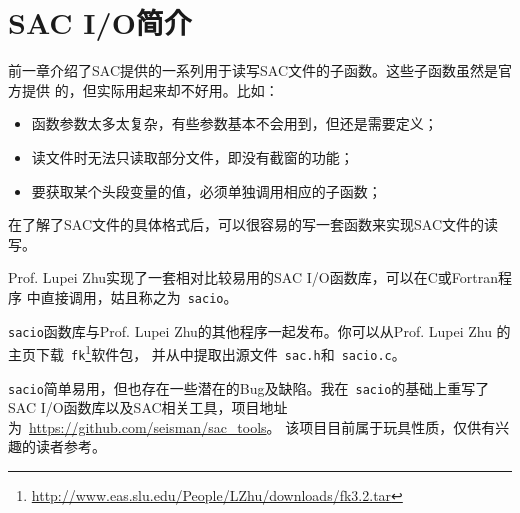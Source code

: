 \section{SAC I/O简介}
前一章介绍了SAC提供的一系列用于读写SAC文件的子函数。这些子函数虽然是官方提供
的，但实际用起来却不好用。比如：
\begin{itemize}
\item 函数参数太多太复杂，有些参数基本不会用到，但还是需要定义；
\item 读文件时无法只读取部分文件，即没有截窗的功能；
\item 要获取某个头段变量的值，必须单独调用相应的子函数；
\end{itemize}

在了解了SAC文件的具体格式后，可以很容易的写一套函数来实现SAC文件的读写。

Prof. Lupei Zhu实现了一套相对比较易用的SAC I/O函数库，可以在C或Fortran程序
中直接调用，姑且称之为~\verb+sacio+。

\verb+sacio+函数库与Prof. Lupei Zhu的其他程序一起发布。你可以从Prof. Lupei Zhu
的主页下载~\verb+fk+\footnote{\url{http://www.eas.slu.edu/People/LZhu/downloads/fk3.2.tar}}软件包，
并从中提取出源文件~\verb+sac.h+和~\verb+sacio.c+。

\verb+sacio+简单易用，但也存在一些潜在的Bug及缺陷。我在~\verb+sacio+的基础上重写了
SAC I/O函数库以及SAC相关工具，项目地址为~\url{https://github.com/seisman/sac_tools}。
该项目目前属于玩具性质，仅供有兴趣的读者参考。
